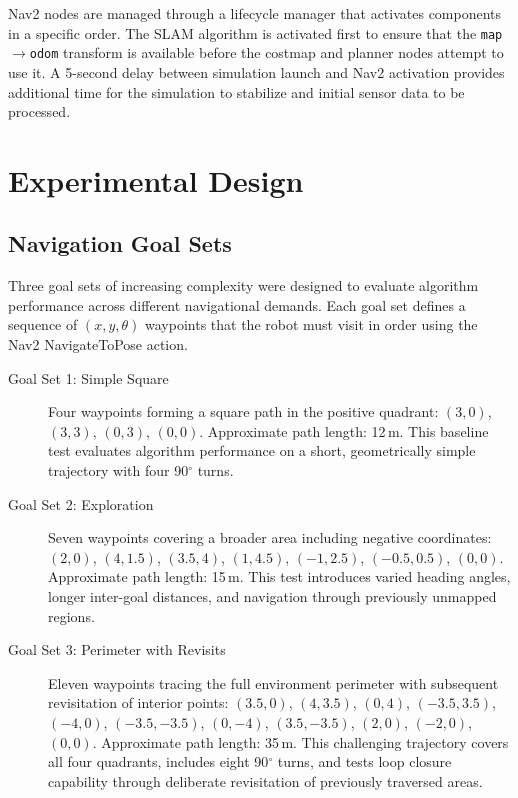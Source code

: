 Nav2 nodes are managed through a lifecycle manager that activates components in a specific order. The SLAM algorithm is activated first to ensure that the \texttt{map}$\rightarrow$\texttt{odom} transform is available before the costmap and planner nodes attempt to use it. A 5-second delay between simulation launch and Nav2 activation provides additional time for the simulation to stabilize and initial sensor data to be processed.

\section{Experimental Design}

\subsection{Navigation Goal Sets}

Three goal sets of increasing complexity were designed to evaluate algorithm performance across different navigational demands. Each goal set defines a sequence of $(x, y, \theta)$ waypoints that the robot must visit in order using the Nav2 NavigateToPose action.

\begin{description}
\item[Goal Set 1: Simple Square] Four waypoints forming a square path in the positive quadrant: $(3, 0)$, $(3, 3)$, $(0, 3)$, $(0, 0)$. Approximate path length: 12\,m. This baseline test evaluates algorithm performance on a short, geometrically simple trajectory with four 90$^\circ$ turns.

\item[Goal Set 2: Exploration] Seven waypoints covering a broader area including negative coordinates: $(2, 0)$, $(4, 1.5)$, $(3.5, 4)$, $(1, 4.5)$, $(-1, 2.5)$, $(-0.5, 0.5)$, $(0, 0)$. Approximate path length: 15\,m. This test introduces varied heading angles, longer inter-goal distances, and navigation through previously unmapped regions.

\item[Goal Set 3: Perimeter with Revisits] Eleven waypoints tracing the full environment perimeter with subsequent revisitation of interior points: $(3.5, 0)$, $(4, 3.5)$, $(0, 4)$, $(-3.5, 3.5)$, $(-4, 0)$, $(-3.5, -3.5)$, $(0, -4)$, $(3.5, -3.5)$, $(2, 0)$, $(-2, 0)$, $(0, 0)$. Approximate path length: 35\,m. This challenging trajectory covers all four quadrants, includes eight 90$^\circ$ turns, and tests loop closure capability through deliberate revisitation of previously traversed areas.
\end{description}

